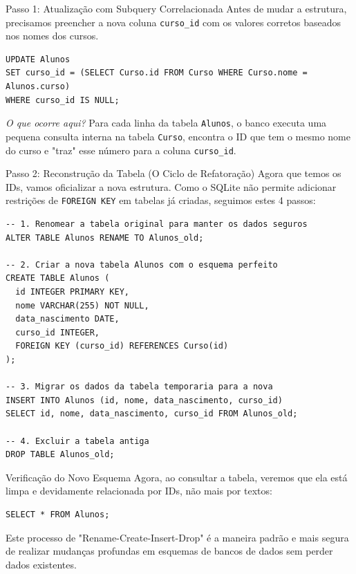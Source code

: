 \documentclass[12pt]{article}
\begin{document}
\begin{block}{Passo 1: Atualização com Subquery Correlacionada}
Antes de mudar a estrutura, precisamos preencher a nova coluna \texttt{curso\_id} com os valores corretos baseados nos nomes dos cursos.

\begin{lstlisting}
UPDATE Alunos
SET curso_id = (SELECT Curso.id FROM Curso WHERE Curso.nome = Alunos.curso)
WHERE curso_id IS NULL;
\end{lstlisting}

\textit{O que ocorre aqui?} Para cada linha da tabela \texttt{Alunos}, o banco executa uma pequena consulta interna na tabela \texttt{Curso}, encontra o ID que tem o mesmo nome do curso e "traz" esse número para a coluna \texttt{curso\_id}.
\end{block}

\begin{block}{Passo 2: Reconstrução da Tabela (O Ciclo de Refatoração)}
Agora que temos os IDs, vamos oficializar a nova estrutura. Como o SQLite não permite adicionar restrições de \texttt{FOREIGN KEY} em tabelas já criadas, seguimos estes 4 passos:

\begin{lstlisting}
-- 1. Renomear a tabela original para manter os dados seguros
ALTER TABLE Alunos RENAME TO Alunos_old;

-- 2. Criar a nova tabela Alunos com o esquema perfeito
CREATE TABLE Alunos (
  id INTEGER PRIMARY KEY,
  nome VARCHAR(255) NOT NULL,
  data_nascimento DATE,
  curso_id INTEGER,
  FOREIGN KEY (curso_id) REFERENCES Curso(id)
);

-- 3. Migrar os dados da tabela temporaria para a nova
INSERT INTO Alunos (id, nome, data_nascimento, curso_id)
SELECT id, nome, data_nascimento, curso_id FROM Alunos_old;

-- 4. Excluir a tabela antiga
DROP TABLE Alunos_old;
\end{lstlisting}
\end{block}

\begin{block}{Verificação do Novo Esquema}
Agora, ao consultar a tabela, veremos que ela está limpa e devidamente relacionada por IDs, não mais por textos:
\begin{lstlisting}
SELECT * FROM Alunos;
\end{lstlisting}
\end{block}

\begin{dica}
Este processo de "Rename-Create-Insert-Drop" é a maneira padrão e mais segura de realizar mudanças profundas em esquemas de bancos de dados sem perder dados existentes.
\end{dica}
\end{document}
